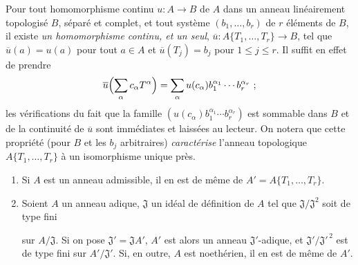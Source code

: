 \begin{env}[7.5.3]
\label{0.7.5.3-fr}
Pour tout homomorphisme continu $u:A\to B$ de $A$ dans un anneau linéairement
topologisé $B$, séparé et complet, et tout système $(b_1,\ldots,b_r)$ de $r$
éléments de $B$, il existe \emph{un homomorphisme continu, et un seul},
$\overline u:A\{T_1,\ldots,T_r\}\to B$, tel que $\overline u(a)=u(a)$ pour
tout $a\in A$ et $\overline u(T_j)=b_j$ pour $1\leq j\leq r$. Il suffit en
effet de prendre
\[
  \overline u\Bigl(\sum_\alpha c_\alpha T^\alpha\Bigr)
  =\sum_\alpha u(c_\alpha)b_1^{\alpha_1}\cdots b_r^{\alpha_r}~;
\]
les vérifications du fait que la famille
$(u(c_\alpha)b_1^{\alpha_1}\cdots b_r^{\alpha_r})$ est sommable dans $B$ et
de la continuité de $\overline u$ sont immédiates et laissées au lecteur. On
notera que cette propriété (pour $B$ et les $b_j$ arbitraires)
\emph{caractérise} l'anneau topologique $A\{T_1,\ldots,T_r\}$ à un
isomorphisme unique près.
\end{env}

\begin{proposition}[7.5.4]
\label{0.7.5.4-fr}
\begin{enumerate}
  \item[(i)] Si $A$ est un anneau admissible, il en est de même de
  $A'=A\{T_1,\ldots,T_r\}$.
  \item[(ii)] Soient $A$ un anneau adique, $\mathfrak J$ un idéal de définition
  de $A$ tel que $\mathfrak J/\mathfrak J^2$ soit de type fini


  sur $A/\mathfrak J$. Si on pose $\mathfrak J'=\mathfrak JA'$, $A'$ est alors
  un anneau $\mathfrak J'$-adique, et
  $\mathfrak J'/\mathfrak J'^{\,2}$ est de type fini sur
  $A'/\mathfrak J'$. Si, en outre, $A$ est noethérien, il en est de même de
  $A'$.
\end{enumerate}
\end{proposition}

